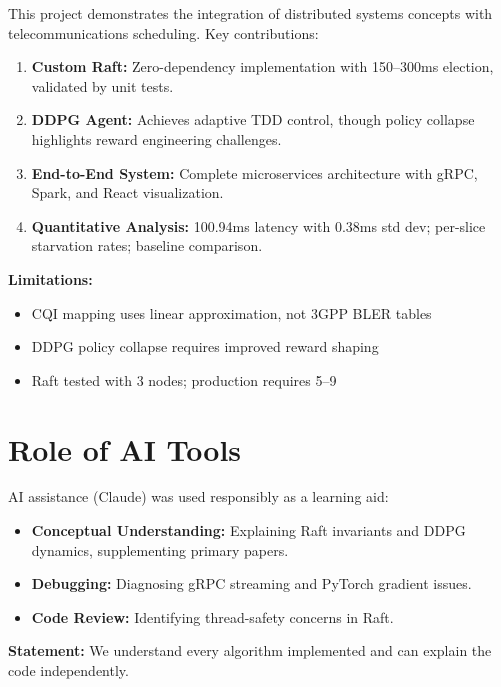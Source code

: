 \documentclass[journal]{IEEEtran}
\begin{document}
This project demonstrates the integration of distributed systems concepts with telecommunications scheduling. Key contributions:

\begin{enumerate}
    \item \textbf{Custom Raft:} Zero-dependency implementation with 150--300ms election, validated by unit tests.
    \item \textbf{DDPG Agent:} Achieves adaptive TDD control, though policy collapse highlights reward engineering challenges.
    \item \textbf{End-to-End System:} Complete microservices architecture with gRPC, Spark, and React visualization.
    \item \textbf{Quantitative Analysis:} 100.94ms latency with 0.38ms std dev; per-slice starvation rates; baseline comparison.
\end{enumerate}

\textbf{Limitations:}
\begin{itemize}
    \item CQI mapping uses linear approximation, not 3GPP BLER tables
    \item DDPG policy collapse requires improved reward shaping
    \item Raft tested with 3 nodes; production requires 5--9
\end{itemize}

\section*{Role of AI Tools}

AI assistance (Claude) was used responsibly as a learning aid:

\begin{itemize}
    \item \textbf{Conceptual Understanding:} Explaining Raft invariants and DDPG dynamics, supplementing primary papers.
    \item \textbf{Debugging:} Diagnosing gRPC streaming and PyTorch gradient issues.
    \item \textbf{Code Review:} Identifying thread-safety concerns in Raft.
\end{itemize}

\textbf{Statement:} We understand every algorithm implemented and can explain the code independently.
\end{document}
